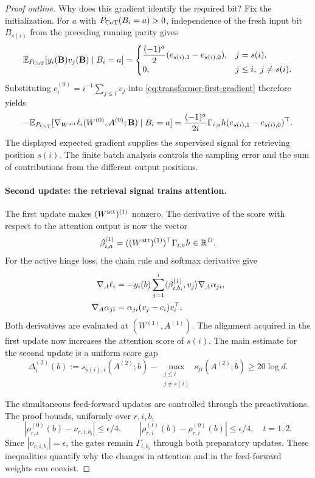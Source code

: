\documentclass[11pt,twoside]{article}
\newcommand{\E}{\mathbb E}
\newcommand{\R}{\mathbb R}
\theoremstyle{definition}
\theoremstyle{remark}
\begin{document}
\begin{proof}[Proof outline]
Why does this gradient identify the required bit? Fix the initialization.
For $a$ with $P_{\rm CoT}(B_i=a)>0$, independence of the fresh input bit
$B_{s(i)}$ from the preceding running parity gives
\begin{equation}
\E_{P_{\rm CoT}}[y_i(\mathbf B)v_j(\mathbf B)\mid B_i=a]
=
\begin{cases}
\dfrac{(-1)^a}{2}(e_{s(i),1}-e_{s(i),0}),&j=s(i),\\
0,&j\le i,\ j\ne s(i).
\end{cases}
\label{eq:transformer-label-signal}
\end{equation}
Substituting $c_i^{(0)}=i^{-1}\sum_{j\le i}v_j$ into
\cref{eq:transformer-first-gradient} therefore yields
\[
-\E_{P_{\rm CoT}}[
\nabla_{W^{\rm att}}\ell_i(W^{(0)},A^{(0)};\mathbf B)\mid B_i=a]
=\frac{(-1)^a}{2i}\Gamma_{i,a}h
(e_{s(i),1}-e_{s(i),0})^\top.
\]
The displayed expected gradient supplies the supervised signal for retrieving
position $s(i)$. The finite
batch analysis controls the sampling error and the sum of contributions
from the different output positions.

\paragraph{Second update: the retrieval signal trains attention.}
The first update makes $(W^{\rm att})^{(1)}$ nonzero. The derivative of the
score with respect to the attention output is now the vector
\[
\beta_{i,a}^{(1)}
=((W^{\rm att})^{(1)})^\top\Gamma_{i,a}h\in\R^D.
\]
For the active hinge loss, the chain rule and softmax derivative give
\begin{align}
\nabla_A\ell_i
&=-y_i(b)\sum_{j=1}^i
 \langle\beta_{i,b_i}^{(1)},v_j\rangle
 \nabla_A\alpha_{ji},\notag\\
\nabla_A\alpha_{ji}
&=\alpha_{ji}(v_j-c_i)v_i^\top.
\label{eq:transformer-attention-gradient}
\end{align}
Both derivatives are evaluated at $(W^{(1)},A^{(1)})$.
The alignment acquired in the first update now increases the attention score
of $s(i)$. The main estimate for the second update is a uniform score gap
\[
\Delta_i^{(2)}(b)
:=s_{s(i),i}(A^{(2)};b)
-\max_{\substack{j\le i\\j\ne s(i)}}s_{ji}(A^{(2)};b)
\ge20\log d.
\]

The simultaneous feed-forward updates are controlled through the
preactivations. The proof bounds, uniformly over $r,i,b$,
\[
|\rho_{r,i}^{(0)}(b)-\nu_{r,i,b_i}|\le\epsilon/4,
\qquad
|\rho_{r,i}^{(t)}(b)-\rho_{r,i}^{(0)}(b)|\le\epsilon/4,
\quad t=1,2.
\]
Since $|\nu_{r,i,b_i}|=\epsilon$, the gates remain $\Gamma_{i,b_i}$ through
both preparatory updates. These inequalities quantify why the changes in
attention and in the feed-forward weights can coexist.


\end{proof}
\end{document}
